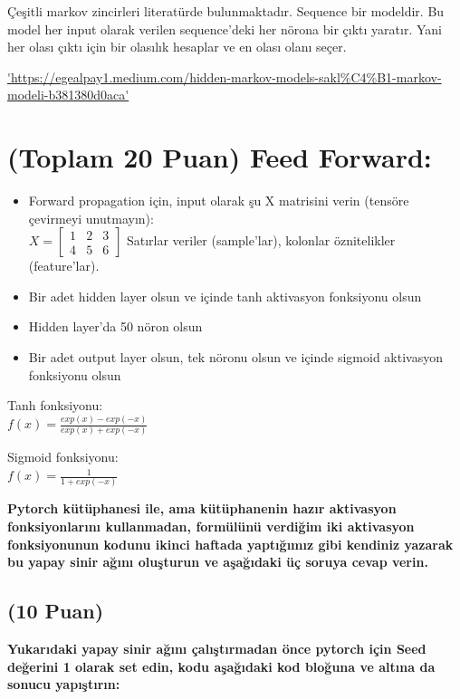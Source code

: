 \documentclass[11pt]{article}
\begin{document}
Çeşitli markov zincirleri literatürde bulunmaktadır. Sequence bir modeldir. Bu model her input olarak verilen sequence'deki her nörona bir çıktı yaratır. Yani her olası çıktı için bir olasılık hesaplar ve en olası olanı seçer.

\url{'https://egealpay1.medium.com/hidden-markov-models-sakl%C4%B1-markov-modeli-b381380d0aca'}

\section{(Toplam 20 Puan) Feed Forward:}
 
\begin{itemize}
    \item Forward propagation için, input olarak şu X matrisini verin (tensöre çevirmeyi unutmayın):\\
    $X = \begin{bmatrix}
        1 & 2 & 3\\
        4 & 5 & 6
        \end{bmatrix}$
    Satırlar veriler (sample'lar), kolonlar öznitelikler (feature'lar).
    \item Bir adet hidden layer olsun ve içinde tanh aktivasyon fonksiyonu olsun
    \item Hidden layer'da 50 nöron olsun
    \item Bir adet output layer olsun, tek nöronu olsun ve içinde sigmoid aktivasyon fonksiyonu olsun
\end{itemize}

Tanh fonksiyonu:\\
$f(x) = \frac{exp(x) - exp(-x)}{exp(x) + exp(-x)}$
\vspace{.2in}

Sigmoid fonksiyonu:\\
$f(x) = \frac{1}{1 + exp(-x)}$

\vspace{.2in}
 \textbf{Pytorch kütüphanesi ile, ama kütüphanenin hazır aktivasyon fonksiyonlarını kullanmadan, formülünü verdiğim iki aktivasyon fonksiyonunun kodunu ikinci haftada yaptığımız gibi kendiniz yazarak bu yapay sinir ağını oluşturun ve aşağıdaki üç soruya cevap verin.}
 
\subsection{(10 Puan)} \textbf{Yukarıdaki yapay sinir ağını çalıştırmadan önce pytorch için Seed değerini 1 olarak set edin, kodu aşağıdaki kod bloğuna ve altına da sonucu yapıştırın:}
\end{document}
